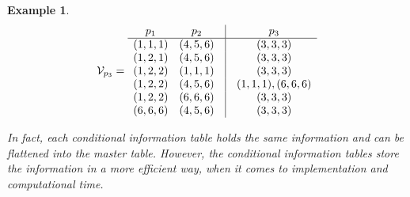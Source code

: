 \documentclass{article}
\newtheorem{example}{Example}[section]
\begin{document}
\begin{example}
\[ \left. \mathcal{V}_{p_3} = \right. 
\begin{array}{cccc}
p_1 & p_2 & \vline & p_3 \\ \hline
(1,1,1) & (4,5,6) & \vline & (3,3,3) \\
(1,2,1) & (4,5,6) & \vline & (3,3,3) \\
(1,2,2) & (1,1,1) & \vline & (3,3,3) \\
(1,2,2) & (4,5,6) & \vline & (1,1,1), (6,6,6) \\
(1,2,2) & (6,6,6) & \vline & (3,3,3) \\
(6,6,6) & (4,5,6) & \vline & (3,3,3)
\end{array} 
\]

In fact, each conditional information table holds the same information and can be flattened into the master table. However, the conditional information tables store the information in a more efficient way, when it comes to implementation and computational time.

\end{example}
\end{document}
